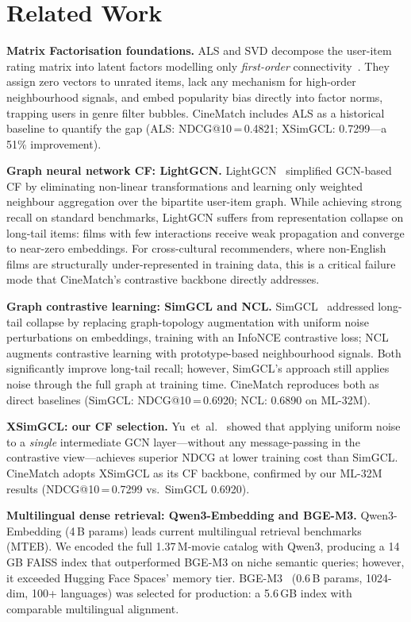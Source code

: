 \documentclass[conference]{IEEEtran}
\begin{document}
\section{Related Work}

\textbf{Matrix Factorisation foundations.}
ALS and SVD decompose the user-item rating matrix into latent factors
modelling only \emph{first-order} connectivity~\cite{movielens}.
They assign zero vectors to unrated items, lack any mechanism for
high-order neighbourhood signals, and embed popularity bias directly
into factor norms, trapping users in genre filter bubbles.
CineMatch includes ALS as a historical baseline to quantify the gap
(ALS: NDCG@10\,=\,0.4821; XSimGCL: 0.7299---a 51\% improvement).

\textbf{Graph neural network CF: LightGCN.}
LightGCN~\cite{lightgcn} simplified GCN-based CF by eliminating
non-linear transformations and learning only weighted neighbour
aggregation over the bipartite user-item graph.
While achieving strong recall on standard benchmarks, LightGCN suffers
from representation collapse on long-tail items: films with few
interactions receive weak propagation and converge to near-zero embeddings.
For cross-cultural recommenders, where non-English films are structurally
under-represented in training data, this is a critical failure mode
that CineMatch's contrastive backbone directly addresses.

\textbf{Graph contrastive learning: SimGCL and NCL.}
SimGCL~\cite{xsimgcl} addressed long-tail collapse by replacing
graph-topology augmentation with uniform noise perturbations on embeddings,
training with an InfoNCE contrastive loss; NCL~\cite{ncl} augments
contrastive learning with prototype-based neighbourhood signals.
Both significantly improve long-tail recall; however, SimGCL's approach
still applies noise through the full graph at training time.
CineMatch reproduces both as direct baselines
(SimGCL: NDCG@10\,=\,0.6920; NCL: 0.6890 on ML-32M).

\textbf{XSimGCL: our CF selection.}
Yu~et~al.~\cite{xsimgcl} showed that applying uniform noise to a
\emph{single} intermediate GCN layer---without any message-passing in
the contrastive view---achieves superior NDCG at lower training cost
than SimGCL.
CineMatch adopts XSimGCL as its CF backbone, confirmed by our
ML-32M results (NDCG@10\,=\,0.7299 vs.\ SimGCL 0.6920).

\textbf{Multilingual dense retrieval: Qwen3-Embedding and BGE-M3.}
Qwen3-Embedding (4\,B params) leads current multilingual retrieval
benchmarks (MTEB).
We encoded the full 1.37\,M-movie catalog with Qwen3, producing a
14\,GB FAISS index that outperformed BGE-M3 on niche semantic queries;
however, it exceeded Hugging Face Spaces' memory tier.
BGE-M3~\cite{bgem3} (0.6\,B params, 1024-dim, 100+ languages) was
selected for production: a 5.6\,GB index with comparable multilingual
alignment.
\end{document}
